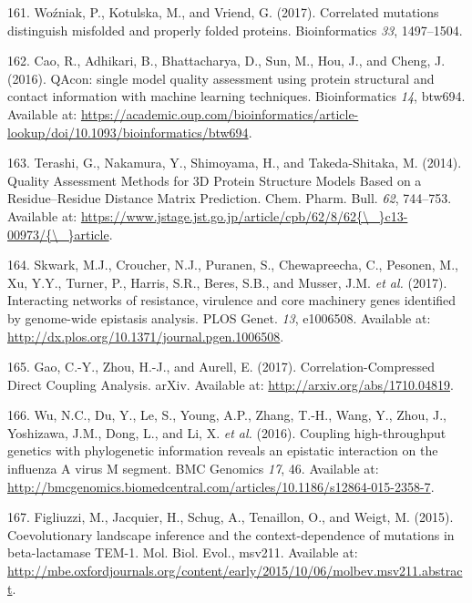 \documentclass[11pt,a4paper,twoside]{book}
\theoremstyle{definition}
\theoremstyle{definition}
\theoremstyle{remark}
\begin{document}
\hypertarget{ref-Wozniak2017}{}
161. Woźniak, P., Kotulska, M., and Vriend, G. (2017). Correlated
mutations distinguish misfolded and properly folded proteins.
Bioinformatics \emph{33}, 1497--1504.

\hypertarget{ref-Cao2016}{}
162. Cao, R., Adhikari, B., Bhattacharya, D., Sun, M., Hou, J., and
Cheng, J. (2016). QAcon: single model quality assessment using protein
structural and contact information with machine learning techniques.
Bioinformatics \emph{14}, btw694. Available at:
\url{https://academic.oup.com/bioinformatics/article-lookup/doi/10.1093/bioinformatics/btw694}.

\hypertarget{ref-Terashi2014a}{}
163. Terashi, G., Nakamura, Y., Shimoyama, H., and Takeda-Shitaka, M.
(2014). Quality Assessment Methods for 3D Protein Structure Models Based
on a Residue--Residue Distance Matrix Prediction. Chem. Pharm. Bull.
\emph{62}, 744--753. Available at:
\href{https://www.jstage.jst.go.jp/article/cpb/62/8/62\%7B/_\%7Dc13-00973/\%7B/_\%7Darticle}{https://www.jstage.jst.go.jp/article/cpb/62/8/62\{\textbackslash{}\_\}c13-00973/\{\textbackslash{}\_\}article}.

\hypertarget{ref-Skwark2017}{}
164. Skwark, M.J., Croucher, N.J., Puranen, S., Chewapreecha, C.,
Pesonen, M., Xu, Y.Y., Turner, P., Harris, S.R., Beres, S.B., and
Musser, J.M. \emph{et al.} (2017). Interacting networks of resistance,
virulence and core machinery genes identified by genome-wide epistasis
analysis. PLOS Genet. \emph{13}, e1006508. Available at:
\url{http://dx.plos.org/10.1371/journal.pgen.1006508}.

\hypertarget{ref-Gao2017}{}
165. Gao, C.-Y., Zhou, H.-J., and Aurell, E. (2017).
Correlation-Compressed Direct Coupling Analysis. arXiv. Available at:
\url{http://arxiv.org/abs/1710.04819}.

\hypertarget{ref-Wu2016}{}
166. Wu, N.C., Du, Y., Le, S., Young, A.P., Zhang, T.-H., Wang, Y.,
Zhou, J., Yoshizawa, J.M., Dong, L., and Li, X. \emph{et al.} (2016).
Coupling high-throughput genetics with phylogenetic information reveals
an epistatic interaction on the influenza A virus M segment. BMC
Genomics \emph{17}, 46. Available at:
\url{http://bmcgenomics.biomedcentral.com/articles/10.1186/s12864-015-2358-7}.

\hypertarget{ref-Figliuzzi2015}{}
167. Figliuzzi, M., Jacquier, H., Schug, A., Tenaillon, O., and Weigt,
M. (2015). Coevolutionary landscape inference and the context-dependence
of mutations in beta-lactamase TEM-1. Mol. Biol. Evol., msv211.
Available at:
\url{http://mbe.oxfordjournals.org/content/early/2015/10/06/molbev.msv211.abstract}.
\end{document}
